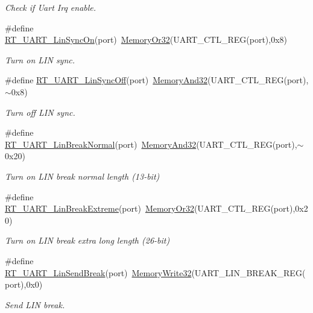 \begin{DoxyCompactItemize}
\begin{DoxyCompactList}\small\item\em Check if Uart Irq enable. \end{DoxyCompactList}\item 
\#define \mbox{\hyperlink{a00173_a49f9d43f5fd87ceed952123010e015fa}{R\+T\+\_\+\+U\+A\+R\+T\+\_\+\+Lin\+Sync\+On}}(port)~\mbox{\hyperlink{a00068_a27874a97deab7cecdde5ddecf466e31e}{Memory\+Or32}}(U\+A\+R\+T\+\_\+\+C\+T\+L\+\_\+\+R\+EG(port),0x8)
\begin{DoxyCompactList}\small\item\em Turn on L\+IN sync. \end{DoxyCompactList}\item 
\#define \mbox{\hyperlink{a00173_aea01869278bc3c4e332af854c4e660be}{R\+T\+\_\+\+U\+A\+R\+T\+\_\+\+Lin\+Sync\+Off}}(port)~\mbox{\hyperlink{a00068_ad87cedffcaadc51db22594fce55173d4}{Memory\+And32}}(U\+A\+R\+T\+\_\+\+C\+T\+L\+\_\+\+R\+EG(port),$\sim$0x8)
\begin{DoxyCompactList}\small\item\em Turn off L\+IN sync. \end{DoxyCompactList}\item 
\#define \mbox{\hyperlink{a00173_a45d1e1116c5b535f276acc73e522570f}{R\+T\+\_\+\+U\+A\+R\+T\+\_\+\+Lin\+Break\+Normal}}(port)~\mbox{\hyperlink{a00068_ad87cedffcaadc51db22594fce55173d4}{Memory\+And32}}(U\+A\+R\+T\+\_\+\+C\+T\+L\+\_\+\+R\+EG(port),$\sim$0x20)
\begin{DoxyCompactList}\small\item\em Turn on L\+IN break normal length (13-\/bit) \end{DoxyCompactList}\item 
\#define \mbox{\hyperlink{a00173_a9e7d98206f07485a3347bab6672a971c}{R\+T\+\_\+\+U\+A\+R\+T\+\_\+\+Lin\+Break\+Extreme}}(port)~\mbox{\hyperlink{a00068_a27874a97deab7cecdde5ddecf466e31e}{Memory\+Or32}}(U\+A\+R\+T\+\_\+\+C\+T\+L\+\_\+\+R\+EG(port),0x20)
\begin{DoxyCompactList}\small\item\em Turn on L\+IN break extra long length (26-\/bit) \end{DoxyCompactList}\item 
\#define \mbox{\hyperlink{a00173_ad1e6c13693e5ea54a55ce78635617178}{R\+T\+\_\+\+U\+A\+R\+T\+\_\+\+Lin\+Send\+Break}}(port)~\mbox{\hyperlink{a00068_a6b9732365b12e48ddb89fe1028b975b0}{Memory\+Write32}}(U\+A\+R\+T\+\_\+\+L\+I\+N\+\_\+\+B\+R\+E\+A\+K\+\_\+\+R\+EG(port),0x0)
\begin{DoxyCompactList}\small\item\em Send L\+IN break. \end{DoxyCompactList}\item 

\end{DoxyCompactItemize}

